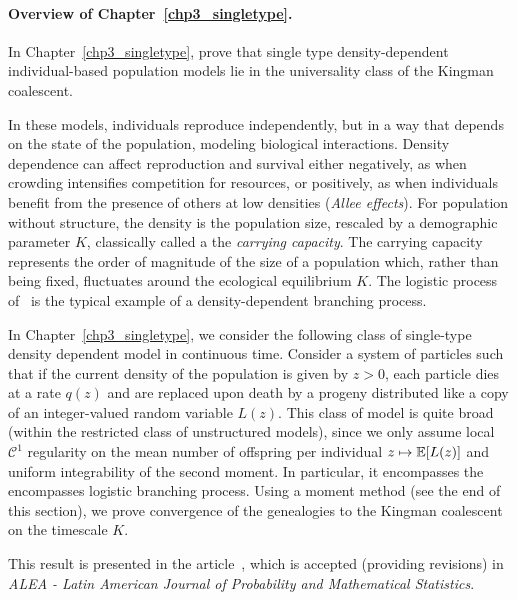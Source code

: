 \paragraph{Overview of Chapter~\ref{chp3_singletype}.}

In Chapter~\ref{chp3_singletype}, prove that single type density-dependent individual-based population models lie in the universality class of the Kingman coalescent.

In these models, individuals reproduce independently, but in a
way that depends on the state of the population, modeling biological interactions. Density dependence can affect reproduction and survival either negatively, as when crowding intensifies competition for resources, or positively, as when individuals benefit from the presence of others at low densities (\emph{Allee effects}).
For population without structure, the density is the population size, rescaled by a demographic parameter $K$, classically called a the \emph{carrying capacity}. The carrying capacity represents the order of magnitude of the size of a population which, rather than being fixed, fluctuates around the ecological equilibrium $K$.  The logistic process of~\citet{Lambert2005} is the typical example of a density-dependent branching process.


In Chapter~\ref{chp3_singletype}, we consider the following class of single-type density dependent model in continuous time.
Consider a system of particles such that if the current density of the population is given by $z>0$, each particle dies at a rate $q(z)$ and are replaced upon death by a progeny distributed like a copy of an integer-valued random variable $L(z)$.
This class of model is quite broad (within the restricted class of unstructured models), since we only assume local $\mathcal{C}^1$ regularity on the mean number of offspring per individual $z\mapsto \operatorname{\mathbb{E}}[L(z)]$ and uniform integrability of the second moment. In particular, it encompasses the encompasses logistic branching process. Using a moment method (see the end of this section), we prove convergence of the genealogies to the Kingman coalescent on the timescale $K$.

This result is presented in the article~\cite{AFRS_2025}, which is accepted (providing revisions) in \emph{ALEA - Latin American Journal of Probability and Mathematical Statistics}.


